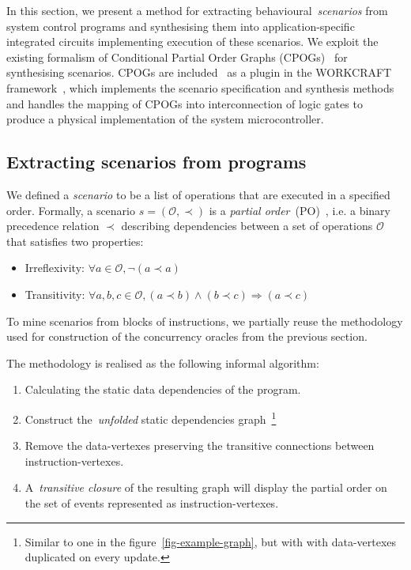 In this section, we present a method for extracting behavioural~\emph{scenarios} from
system control programs and synthesising them into application-specific
integrated circuits implementing execution of these scenarios. We exploit the
existing formalism of Conditional Partial Order Graphs (CPOGs)~\cite{cpogs} for
synthesising scenarios. CPOGs are included~\cite{scenco} as a plugin in the WORKCRAFT
framework~\cite{workcraft}, which implements the scenario specification and
synthesis methods and handles the mapping of CPOGs into interconnection of
logic gates to produce a physical implementation of the system microcontroller.

\subsection{Extracting scenarios from programs}

We defined a \textit{scenario} to be a list of
operations that are executed in a specified order. Formally, a scenario
$s=(\mathcal{O},\prec)$ is a \textit{partial order}~(PO)~\cite{PO},
i.e. a binary precedence relation $\prec$ describing dependencies between a
set of operations $\mathcal{O}$ that satisfies two properties:

\begin{itemize}
    \item Irreflexivity: $\forall a \in \mathcal{O}, \neg(a \prec a)$
    \vspace{+1mm}
    \item Transitivity: $\forall a, b, c \in \mathcal{O}, (a \prec b) \wedge (b
    \prec c) \Rightarrow (a \prec c)$
\end{itemize}

To mine scenarios from blocks of instructions, we partially reuse the methodology
used for construction of the concurrency oracles from the previous section.

The methodology is realised as the following informal algorithm:

\begin{enumerate}
    \item Calculating the static data dependencies of the program.
    \item Construct the~\emph{unfolded} static dependencies
        graph~\footnote{Similar to one in the figure~\ref{fig-example-graph},
        but with with data-vertexes duplicated on every update.}
    \item Remove the data-vertexes preserving the transitive connections between
        instruction-vertexes.
    \item A~\emph{transitive closure} of the resulting graph will display the
        partial order on the set of events represented as instruction-vertexes.
\end{enumerate}

